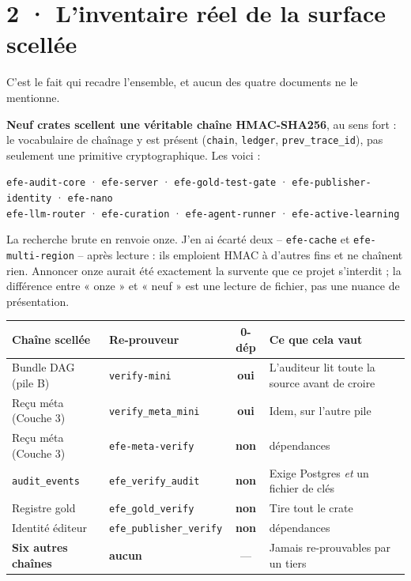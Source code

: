 \documentclass[10pt]{article}
\newcommand{\best}[1]{{\color{green}\textbf{#1}}}
\newcommand{\pire}[1]{{\color{red}\textbf{#1}}}
\newcommand{\code}[1]{\texttt{\small #1}}
\begin{document}
\section{2 · L'inventaire réel de la surface scellée}

C'est le fait qui recadre l'ensemble, et aucun des quatre documents ne le mentionne.

\textbf{Neuf crates scellent une véritable chaîne HMAC-SHA256}, au sens fort : le vocabulaire de
chaînage y est présent (\code{chain}, \code{ledger}, \code{prev\_trace\_id}), pas seulement une primitive
cryptographique. Les voici :

\begin{extrait}
\code{efe-audit-core} \; · \; \code{efe-server} \; · \; \code{efe-gold-test-gate} \; · \;
\code{efe-publisher-identity} \; · \; \code{efe-nano} \\[1.5pt]
\code{efe-llm-router} \; · \; \code{efe-curation} \; · \; \code{efe-agent-runner} \; · \;
\code{efe-active-learning}
\end{extrait}

La recherche brute en renvoie onze. J'en ai écarté deux -- \code{efe-cache} et \code{efe-multi-region} --
après lecture : ils emploient HMAC à d'autres fins et ne chaînent rien. Annoncer onze aurait été
exactement la survente que ce projet s'interdit ; la différence entre « onze » et « neuf » est une
lecture de fichier, pas une nuance de présentation.

\renewcommand{\arraystretch}{1.15}
\begin{center}\small
\begin{tabular}{@{}>{\raggedright\arraybackslash}p{4.5cm} >{\raggedright\arraybackslash}p{4.3cm} c >{\raggedright\arraybackslash}p{5.6cm}@{}}
\toprule
\textbf{Chaîne scellée} & \textbf{Re-prouveur} & \textbf{0-dép} & \textbf{Ce que cela vaut} \\
\midrule
Bundle DAG (pile B) & \code{verify-mini} & \best{oui} & L'auditeur lit toute la source avant de croire \\
Reçu méta (Couche 3) & \code{verify\_meta\_mini} & \best{oui} & Idem, sur l'autre pile \\
Reçu méta (Couche 3) & \code{efe-meta-verify} & \pire{non} & 70 dépendances \\
\code{audit\_events} & \code{efe\_verify\_audit} & \pire{non} & Exige Postgres \emph{et} un fichier de clés \\
Registre gold & \code{efe\_gold\_verify} & \pire{non} & Tire tout le crate \\
Identité éditeur & \code{efe\_publisher\_verify} & \pire{non} & 115 dépendances \\
\textbf{Six autres chaînes} & \mbox{\pire{aucun}} & --- & Jamais re-prouvables par un tiers \\
\bottomrule
\end{tabular}
\end{center}
\end{document}
